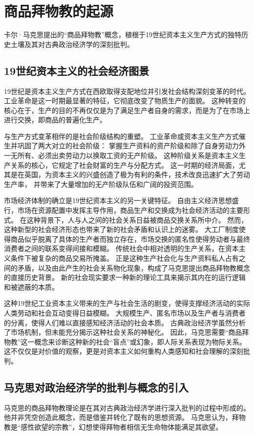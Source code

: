 \section{商品拜物教的起源}
卡尔·马克思提出的“商品拜物教”概念，植根于19世纪资本主义生产方式的独特历史土壤及其对古典政治经济学的深刻批判。
\subsection{19世纪资本主义的社会经济图景}
19世纪是资本主义生产方式在西欧取得支配地位并引发社会结构深刻变革的时代。
工业革命是这一时期最显著的特征，它彻底改变了物质生产的面貌\autocite{jinji}。
这种转变的核心在于，生产的目的不再仅仅是为了满足生产者自身的需求，而是为了在市场上进行交换，即商品的普遍化生产\autocite{jinji}。

与生产方式变革相伴的是社会阶级结构的重塑。
工业革命或资本主义生产方式催生并巩固了两大对立的社会阶级：
掌握生产资料的资产阶级和除了自身劳动力外一无所有、必须出卖劳动力以换取工资的无产阶级。
这种阶级关系是资本主义生产关系的核心，它规定了社会财富的生产与分配方式。
这一时期的经济局面，尤其是在英国，为资本主义的兴盛创造了极为有利的条件，技术改良迅速扩大了劳动生产率，
并带来了大量增加的无产阶级队伍和广阔的投资范围。

市场经济体制的确立是19世纪资本主义的另一关键特征。
自由主义经济思想盛行，市场在资源配置中发挥主导作用，商品生产和交换成为社会经济活动的主要形式。
在这种背景下，人与人之间的社会关系日益被商品交换关系所中介。
然而，这种新型的社会经济形态也带来了新的社会矛盾和认识上的迷雾。
大工厂制度使得商品似乎脱离了具体的生产者而独立存在，市场交换的匿名性使得劳动者与最终消费者之间的联系变得间接和模糊。
传统社会中相对透明的生产关系，在资本主义条件下被复杂的商品交易所掩盖。
正是这种生产社会化与生产资料私人占有之间的矛盾，以及由此产生的社会关系物化现象，构成了马克思提出商品拜物教概念的直接历史背景。
新的社会现实要求一种新的理论工具来揭示其内在的运行逻辑和被遮蔽的本质。

这种19世纪工业资本主义带来的生产与社会生活的剧变，使得支撑经济活动的实际人类劳动和社会互动变得日益模糊。
大规模生产、匿名市场以及生产者与消费者的分离，使得人们难以直接感知经济活动的社会本质。
古典政治经济学虽然分析了市场机制，但未能充分揭示这种社会关系的神秘化。
因此，马克思需要“商品拜物教”这一概念来诊断这种新的社会“盲点”或幻象，即人际关系表现为物际关系。
这不仅仅是对价值的观察，更是对资本主义如何重构人类感知和社会理解的深刻批判。


\subsection{马克思对政治经济学的批判与概念的引入}
马克思的商品拜物教理论是在其对古典政治经济学进行深入批判的过程中形成的。
他并非凭空创造此概念，而是借鉴并转化了既有的思想资源。
马克思认为，拜物教是“感性欲望的宗教”，幻想使得拜物者相信无生命物体能满足其欲望。


